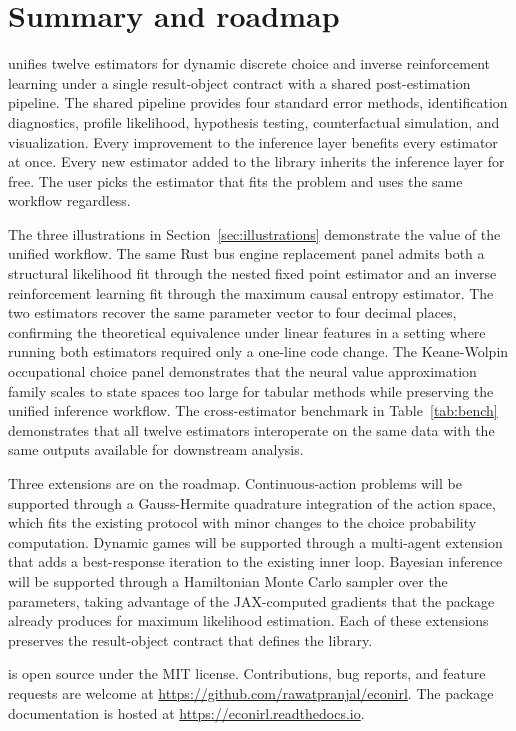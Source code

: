 \section{Summary and roadmap} \label{sec:summary}

 unifies twelve estimators for dynamic discrete choice and inverse reinforcement learning under a single result-object contract with a shared post-estimation pipeline. The shared pipeline provides four standard error methods, identification diagnostics, profile likelihood, hypothesis testing, counterfactual simulation, and visualization. Every improvement to the inference layer benefits every estimator at once. Every new estimator added to the library inherits the inference layer for free. The user picks the estimator that fits the problem and uses the same workflow regardless.

The three illustrations in Section~\ref{sec:illustrations} demonstrate the value of the unified workflow. The same Rust bus engine replacement panel admits both a structural likelihood fit through the nested fixed point estimator and an inverse reinforcement learning fit through the maximum causal entropy estimator. The two estimators recover the same parameter vector to four decimal places, confirming the theoretical equivalence under linear features in a setting where running both estimators required only a one-line code change. The Keane-Wolpin occupational choice panel demonstrates that the neural value approximation family scales to state spaces too large for tabular methods while preserving the unified inference workflow. The cross-estimator benchmark in Table~\ref{tab:bench} demonstrates that all twelve estimators interoperate on the same data with the same outputs available for downstream analysis.

Three extensions are on the roadmap. Continuous-action problems will be supported through a Gauss-Hermite quadrature integration of the action space, which fits the existing protocol with minor changes to the choice probability computation. Dynamic games will be supported through a multi-agent extension that adds a best-response iteration to the existing inner loop. Bayesian inference will be supported through a Hamiltonian Monte Carlo sampler over the parameters, taking advantage of the JAX-computed gradients that the package already produces for maximum likelihood estimation. Each of these extensions preserves the result-object contract that defines the library.

 is open source under the MIT license. Contributions, bug reports, and feature requests are welcome at \url{https://github.com/rawatpranjal/econirl}. The package documentation is hosted at \url{https://econirl.readthedocs.io}.
